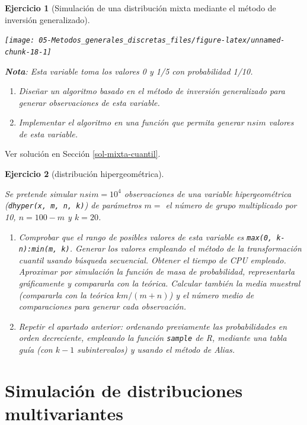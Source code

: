\documentclass[
]{book}
\theoremstyle{break}
\newtheorem{exercise}{Ejercicio}[chapter]
\theoremstyle{nonumberplain}
\begin{document}
\begin{exercise}[Simulación de una distribución mixta mediante el método de inversión generalizado]
\begin{center}\texttt{[image: 05-Metodos\_generales\_discretas\_files/figure-latex/unnamed-chunk-18-1]} \end{center}

\textbf{Nota}: Esta variable toma los valores 0 y 1/5 con probabilidad 1/10.

\begin{enumerate}
\def\labelenumi{\alph{enumi})}
\item
  Diseñar un algoritmo basado en el método de inversión generalizado
  para generar observaciones de esta variable.
\item
  Implementar el algoritmo en una función que permita generar \(nsim\)
  valores de esta variable.
\end{enumerate}

\end{exercise}

Ver solución en Sección \ref{sol-mixta-cuantil}.

\begin{exercise}[distribución hipergeométrica]
\protect\hypertarget{exr:hipergeom}{}\label{exr:hipergeom}

Se pretende simular \(nsim=10^{4}\) observaciones de una variable
hipergeométrica (\texttt{dhyper(x,\ m,\ n,\ k)}) de parámetros \(m=\) el número
de grupo multiplicado por 10, \(n=100-m\) y \(k=20\).

\begin{enumerate}
\def\labelenumi{\alph{enumi})}
\item
  Comprobar que el rango de posibles valores de esta variable es
  \texttt{max(0,\ k-n):min(m,\ k)}. Generar los valores empleando el método
  de la transformación cuantil usando búsqueda secuencial. Obtener
  el tiempo de CPU empleado. Aproximar por simulación la función
  de masa de probabilidad, representarla gráficamente y compararla
  con la teórica. Calcular también la media muestral (compararla
  con la teórica \(km/(m+n)\)) y el número medio de comparaciones
  para generar cada observación.
\item
  Repetir el apartado anterior: ordenando previamente las
  probabilidades en orden decreciente, empleando la
  función \texttt{sample} de R, mediante una tabla guía (con
  \(k-1\) subintervalos) y usando el método de Alias.
\end{enumerate}

\end{exercise}

\hypertarget{multivariante}{%
\chapter{Simulación de distribuciones multivariantes}\label{multivariante}}
\end{document}
